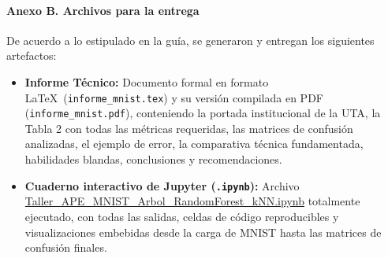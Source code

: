 \documentclass[11pt,a4paper]{article}
\begin{document}
\paragraph{Anexo B. Archivos para la entrega}
De acuerdo a lo estipulado en la guía, se generaron y entregan los siguientes artefactos:
\begin{itemize}[leftmargin=*]
    \item \textbf{Informe Técnico:} Documento formal en formato \LaTeX\ (\texttt{informe\_mnist.tex}) y su versión compilada en PDF (\texttt{informe\_mnist.pdf}), conteniendo la portada institucional de la UTA, la Tabla 2 con todas las métricas requeridas, las matrices de confusión analizadas, el ejemplo de error, la comparativa técnica fundamentada, habilidades blandas, conclusiones y recomendaciones.
    \item \textbf{Cuaderno interactivo de Jupyter (\texttt{.ipynb}):} Archivo \url{Taller_APE_MNIST_Arbol_RandomForest_kNN.ipynb} totalmente ejecutado, con todas las salidas, celdas de código reproducibles y visualizaciones embebidas desde la carga de MNIST hasta las matrices de confusión finales.
\end{itemize}
\end{document}
